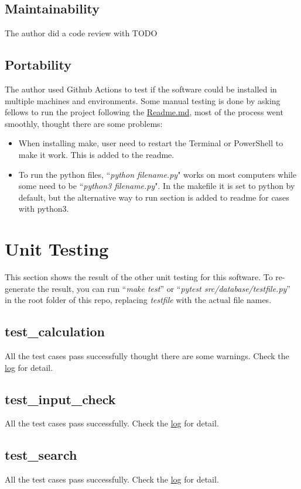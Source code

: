 \documentclass[12pt, titlepage]{article}
\begin{document}
\subsection{Maintainability}
The author did a code review with TODO

\subsection{Portability}
The author used Github Actions to test if the software could be installed in multiple machines and environments. Some manual testing is done by asking fellows to run the project following the \href{https://github.com/CynthiaLiu0805/BridgeCorrosion/blob/main/README.md}{Readme.md}, most of the process went smoothly, thought there are some problems:
\begin{itemize}
\item When installing make, user need to restart the Terminal or PowerShell to make it work. This is added to the readme.
\item To run the python files, ``\textit{python filename.py}" works on most computers while some need to be ``\textit{python3 filename.py}". In the makefile it is set to python by default, but the alternative way to run section is added to readme for cases with python3.
\end{itemize}

\section{Unit Testing}\label{UT}
This section shows the result of the other unit testing for this software. To re-generate the result, you can run ``\textit{make test}'' or ``\textit{pytest src/database/testfile.py}'' in the root folder of this repo, replacing \textit{testfile} with the actual file names. 

\subsection{test\_calculation}
All the test cases pass successfully thought there are some warnings. Check the \href{}{log} for detail.

\subsection{test\_input\_check}
All the test cases pass successfully. Check the \href{}{log} for detail.
\subsection{test\_search}
All the test cases pass successfully. Check the \href{}{log} for detail.
\end{document}

